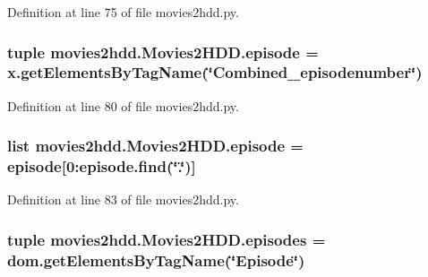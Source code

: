 Definition at line 75 of file movies2hdd.\-py.

\hypertarget{classmovies2hdd_1_1_movies2_h_d_d_af69365988574fd1f1f66bfd372bd526c}{
\subsubsection[{episode}]{\setlength{\rightskip}{0pt plus 5cm}tuple movies2hdd.\-Movies2\-H\-D\-D.\-episode = x.\-get\-Elements\-By\-Tag\-Name(\char`\"{}Combined\-\_\-episodenumber\char`\"{})\hspace{0.3cm}{\ttfamily [static]}}}\label{classmovies2hdd_1_1_movies2_h_d_d_af69365988574fd1f1f66bfd372bd526c}


Definition at line 80 of file movies2hdd.\-py.

\hypertarget{classmovies2hdd_1_1_movies2_h_d_d_ae6cedc0a37fc3d9c391cc0f6bcf872da}{
\subsubsection[{episode}]{\setlength{\rightskip}{0pt plus 5cm}list movies2hdd.\-Movies2\-H\-D\-D.\-episode = episode\mbox{[}0\-:episode.\-find(\char`\"{}.\char`\"{})\mbox{]}\hspace{0.3cm}{\ttfamily [static]}}}\label{classmovies2hdd_1_1_movies2_h_d_d_ae6cedc0a37fc3d9c391cc0f6bcf872da}


Definition at line 83 of file movies2hdd.\-py.

\hypertarget{classmovies2hdd_1_1_movies2_h_d_d_adebd8de5fde82e9d8b512a03892442d1}{
\subsubsection[{episodes}]{\setlength{\rightskip}{0pt plus 5cm}tuple movies2hdd.\-Movies2\-H\-D\-D.\-episodes = dom.\-get\-Elements\-By\-Tag\-Name(\char`\"{}Episode\char`\"{})\hspace{0.3cm}{\ttfamily [static]}}}\label{classmovies2hdd_1_1_movies2_h_d_d_adebd8de5fde82e9d8b512a03892442d1}


